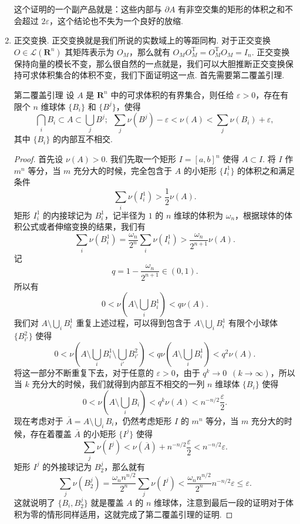 \begin{enumerate}[label=(\arabic*)]
          这个证明的一个副产品就是：这些内部与 $\partial A$ 有非空交集的矩形的体积之和不会超过 $2\varepsilon$，这个结论也不失为一个良好的放缩.

    \item 正交变换. 正交变换就是我们所说的实数域上的等距同构. 对于正交变换 $O\in \mathcal{L}(\mathbf{R}^n)$ 其矩阵表示为 $O_M$，那么就有 $O_MO^\mathrm{T}_M = O_M^\mathrm{T}O_M = I_n$. 正交变换保持向量的模长不变，那么很自然的一点就是，我们可以大胆推断正交变换保持可求体积集合的体积不变，我们下面证明这一点. 首先需要第二覆盖引理.

          \begin{lemma}{第二覆盖引理}{}
              设 $A$ 是 $\mathbf{R}^n$ 中的可求体积的有界集合，则任给 $\varepsilon>0$，存在有限个 $n$ 维球体 $\{B_i\}$ 和 $\{B^j\}$，使得 \[\bigcap_iB_i\subset A \subset \bigcup_jB^j;\enspace \sum_j\nu(B^j) - \varepsilon < \nu(A) < \sum_j\nu(B_i) + \varepsilon,\]
              其中 $\{B_i\}$ 的内部互不相交.
          \end{lemma}

          \begin{proof}
              首先设 $\nu(A)>0$. 我们先取一个矩形 $I = \left[a, b\right]^n$ 使得 $A\subset I$. 将 $I$ 作 $m^n$ 等分，当 $m$ 充分大的时候，完全包含于 $A$ 的小矩形 $\{I_i^1\}$ 的体积之和满足条件 \[\sum_i\nu(I_i^1) > \frac12\nu(A).\]
              矩形 $I_i^1$ 的内接球记为 $B_i^1$，记半径为 $1$ 的 $n$ 维球的体积为 $\omega_n$，根据球体的体积公式或者伸缩变换的结果，我们有 \[\sum_i\nu(B_i^1) = \frac{\omega_n}{2^n}\sum_i\nu(I_i^1) > \frac{\omega_n}{2^{n+1}}\nu(A).\]
              记 \[q = 1 - \frac{\omega_n}{2^{n+1}}\in(0, 1).\]
              所以有 \[ 0 < \nu\left(A \setminus \bigcup_iB_i^1\right) < q\nu(A).\]
              我们对 $A\setminus \bigcup\limits_iB_i^1$ 重复上述过程，可以得到包含于 $A\setminus \bigcup\limits_iB_i^1$ 有限个小球体 $\{B_{i'}^2\}$ 使得 \[0 < \nu\left(A\setminus \bigcup_iB_i^1\setminus \bigcup_{i'}B_{i'}^2\right) < q\nu\left(A\setminus \bigcup_iB_i^1\right) < q^2\nu(A).\]
              将这一部分不断重复下去，对于任意的 $\varepsilon > 0$，由于 $q^k\to 0\enspace (k\to \infty)$，所以当 $k$ 充分大的时候，我们就得到内部互不相交的一列 $n$ 维球体 $\{B_i\}$ 使得 \[0 < \nu\left(A\setminus \bigcup_iB_i\right) < q^k\nu(A) < n^{-n/2}\frac{\varepsilon}{2}.\]
              现在考虑对于 $\overline{A} = A\setminus \bigcup\limits_iB_i$，仍然考虑矩形 $I$ 的 $m^n$ 等分，当 $m$ 充分大的时候，存在着覆盖 $\overline{A}$ 的小矩形 $\{I^j\}$ 使得 \[\sum_j\nu(I^j) < \nu(\overline{A}) + n^{-n/2}\frac{\varepsilon}{2} < n^{-n/2}\varepsilon.\]
              矩形 $I^j$ 的外接球记为 $B_2^j$，那么就有 \[\sum_j\nu(B_2^j) = \frac{\omega_nn^{n/2}}{2^n}\sum_j\nu(I^j) < \frac{\omega_nn^{n/2}}{2^n}n^{-n/2}\varepsilon \leqslant \varepsilon.\]
              这就说明了 $\{B_i, B_2^j\}$ 就是覆盖 $A$ 的 $n$ 维球体，注意到最后一段的证明对于体积为零的情形同样适用，这就完成了第二覆盖引理的证明.
          \end{proof}


\end{enumerate}
